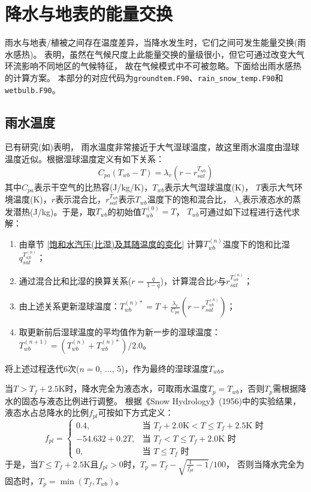 \chapter{降水与地表的能量交换}

雨水与地表/植被之间存在温度差异，当降水发生时，它们之间可发生能量交换(雨水感热)。
\citet{wei2014impact} 表明，虽然在气候尺度上此能量交换的量级很小，但它可通过改变大气环流影响不同地区的气候特征，
故在气候模式中不可被忽略。下面给出雨水感热的计算方案。
本部分的对应代码为\texttt{groundtem.F90}、\texttt{rain\_snow\_temp.F90}和\texttt{wetbulb.F90}。
\section{雨水温度}\label{雨水温度}
已有研究(如\citet{anderson1998moored})表明，
雨水温度非常接近于大气湿球温度，故这里雨水温度由湿球温度近似。根据湿球温度定义有如下关系：
\begin{equation}
C_{p a}\left(T_{w b}-T\right)=\lambda_{v}\left(r-r_{s a t}^{T_{w b}}\right)
\end{equation}
其中$C_{pa}$表示干空气的比热容(J/kg/K)，$T_{wb}$表示大气湿球温度(K)，
$T$表示大气环境温度(K)，$r$表示混合比，$r_{sat}^{T_{wb}}$表示$T_{wb}$温度下的饱和混合比，
$\lambda_v$表示液态水的蒸发潜热(J/kg)。于是，取$T_{wb}$的初始值$T_{wb}^{\left(0\right)}=T$，
$T_{wb}$可通过如下过程进行迭代求解：
\begin{enumerate}
    \item 由章节 \ref{饱和水汽压(比湿)及其随温度的变化} 计算$T_{wb}^{\left(n\right)}$温度下的饱和比湿$q_{sat}^{T_{wb}^{\left(n\right)}}$；
    \item 通过混合比和比湿的换算关系($r=\frac{q}{1-q}$)，计算混合比$r$与$r_{sat}^{T_{wb}^{\left(n\right)}}$；
    \item 由上述关系更新湿球温度：$T_{wb}^{\left(n\right)\ast}=T+\frac{\lambda_v}{C_{pa}}\left(r-r_{sat}^{T_{wb}^{\left(n\right)}}\right)$；
    \item 取更新前后湿球温度的平均值作为新一步的湿球温度：$T_{wb}^{\left(n+1\right)}=\left(T_{wb}^{\left(n\right)}+T_{wb}^{\left(n\right)\ast}\right)/2.0$。
\end{enumerate}
将上述过程迭代6次($n=0$, $\ldots$, 5)，作为最终的湿球温度$T_{wb}$。


当$T>T_f+2.5$K时，降水完全为液态水，可取雨水温度$T_p=T_{wb}$，否则$T_p$需根据降水的固态与液态比例进行调整。
根据《Snow Hydrology》(1956)中的实验结果，液态水占总降水的比例$f_{pl}$可按如下方式定义：
\begin{equation*}
f_{pl}= \begin{cases}
0.4, & \text{当 } T_f+2.0\text{K}<T\le T_f+2.5\text{K} \text{ 时} \\
-54.632+0.2T, & \text{当 } T_f<T\le T_f+2.0\text{K} \text{ 时} \\
0, & \text{当 } T\le T_f \text{ 时}
\end{cases}
\end{equation*}
于是，当$T\le T_f+2.5\text{K}$且$f_{pl}>0$时，$T_p=T_f-\sqrt{\frac{1}{f_{pl}}-1}/100$，
否则当降水完全为固态时，$T_p=\min{\left(T_f,T_{wb}\right)}$。


